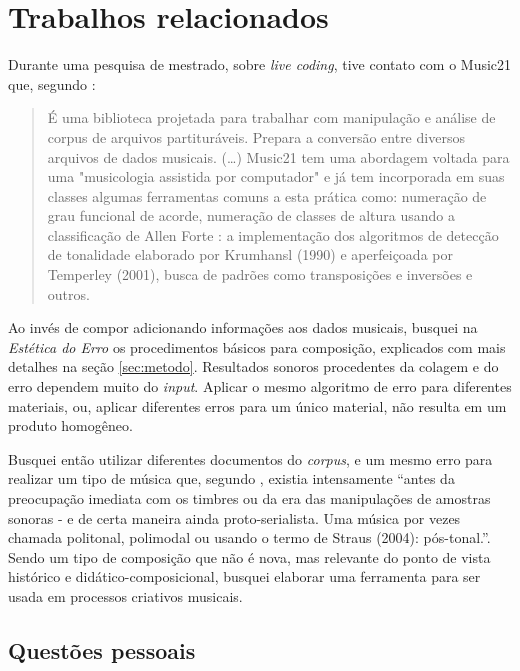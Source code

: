 \section{Trabalhos relacionados}\label{sec:trabalhos}

Durante uma pesquisa de mestrado, sobre \emph{live coding}, tive contato com o Music21 que, segundo \cite{soares_luteria_2015}:

\begin{quote}
É uma biblioteca projetada para trabalhar com manipulação e análise de corpus de arquivos partituráveis. Prepara a conversão entre diversos arquivos de dados musicais. (\ldots) Music21 tem uma abordagem voltada para uma "musicologia assistida por computador" e já tem incorporada em suas classes algumas ferramentas comuns a esta prática como: numeração de grau funcional de acorde, numeração de classes de altura usando a classificação de Allen Forte : a implementação dos algoritmos de detecção de tonalidade elaborado por Krumhansl (1990) e aperfeiçoada por Temperley (2001), busca de padrões como transposições e inversões e outros.\cite[p.~71-72]{soares_luteria_2015}
\end{quote}

Ao invés de compor adicionando informações aos dados musicais, busquei na \emph{Estética do Erro} \cite{cascone_aesthetics_2000} os procedimentos básicos para composição, explicados com mais detalhes na seção \ref{sec:metodo}. Resultados sonoros procedentes da colagem e do erro dependem muito do \emph{input}. Aplicar o mesmo algoritmo de erro para diferentes materiais, ou, aplicar diferentes erros para um único material, não resulta em um produto homogêneo.

Busquei então utilizar diferentes documentos do \emph{corpus}, e um mesmo erro para realizar um tipo de música que, segundo \cite[p.~18]{soares_luteria_2015}, existia intensamente ``antes da preocupação imediata com os timbres ou da era das manipulações de amostras sonoras - e de certa maneira ainda proto-serialista. Uma música por vezes chamada politonal, polimodal ou usando o termo de Straus (2004): pós-tonal.''. Sendo um tipo de composição que não é nova, mas relevante do ponto de vista histórico e didático-composicional,  busquei elaborar uma ferramenta para ser usada em processos criativos musicais. 

\subsection*{Questões pessoais}

